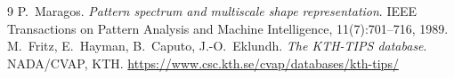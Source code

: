 \documentclass[11pt,a4paper]{article}
\begin{document}
\begin{thebibliography}{9}
 P.~Maragos. \emph{Pattern spectrum and multiscale shape
representation}. IEEE Transactions on Pattern Analysis and Machine Intelligence,
11(7):701--716, 1989.
 M.~Fritz, E.~Hayman, B.~Caputo, J.-O.~Eklundh. \emph{The
KTH-TIPS database}. NADA/CVAP, KTH.
\url{https://www.csc.kth.se/cvap/databases/kth-tips/}
\end{thebibliography}
\end{document}
